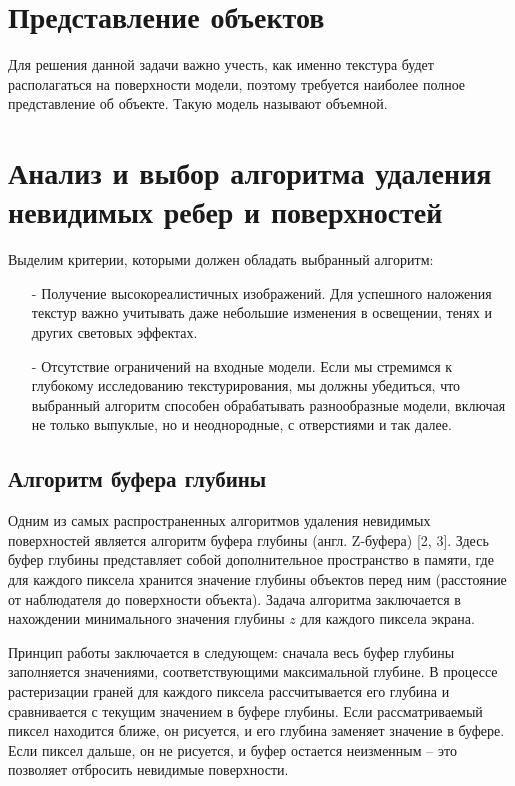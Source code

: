 \section{Представление объектов}

Для решения данной задачи важно учесть, как именно текстура будет располагаться на поверхности модели, поэтому требуется наиболее полное представление об объекте. Такую модель называют объемной.

\section{Анализ и выбор алгоритма удаления невидимых ребер и поверхностей}

Выделим критерии, которыми должен обладать выбранный алгоритм:
\begin{itemize}[label=\arabic*)]
	\item[-] Получение высокореалистичных изображений. Для успешного наложения текстур важно учитывать даже небольшие изменения в освещении, тенях и других световых эффектах.
	\item[-] Отсутствие ограничений на входные модели. Если мы стремимся к глубокому исследованию текстурирования, мы должны убедиться, что выбранный алгоритм способен обрабатывать разнообразные модели, включая не только выпуклые, но и неоднородные, с отверстиями и так далее.
\end{itemize}

\subsection{Алгоритм буфера глубины}

Одним из самых распространенных алгоритмов удаления невидимых поверхностей является алгоритм буфера глубины (англ. Z-буфера) [2, 3]. Здесь буфер глубины представляет собой дополнительное пространство в памяти, где для каждого пиксела хранится значение глубины объектов перед ним (расстояние от наблюдателя до поверхности объекта). Задача алгоритма заключается в нахождении минимального значения глубины $z$ для каждого пиксела экрана.

Принцип работы заключается в следующем: сначала весь буфер глубины
заполняется значениями, соответствующими максимальной глубине. В процессе растеризации граней для каждого пиксела рассчитывается его глубина и сравнивается с текущим значением в буфере глубины. Если рассматриваемый пиксел находится ближе, он рисуется, и его глубина заменяет значение в буфере. Если пиксел дальше, он не рисуется, и буфер остается неизменным – это позволяет отбросить невидимые поверхности.

